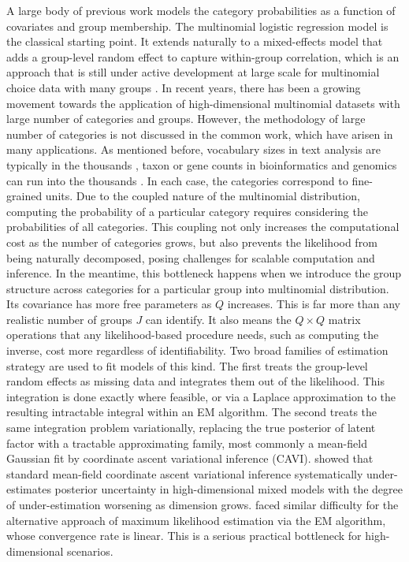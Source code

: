 A large body of previous work models the category probabilities as a function of covariates and group membership. The multinomial logistic regression model is the classical starting point. It extends naturally to a mixed-effects model that adds a group-level random effect to capture within-group correlation, which is an approach that is still under active development at large scale for multinomial choice data with many groups \citep{Zhang2026}. In recent years, there has been a growing movement towards the application of high-dimensional multinomial datasets with large number of categories and groups. 
However, the methodology of large number of categories is not discussed in the common work, which have arisen in many applications. As mentioned before, vocabulary sizes in text analysis are typically in the thousands \citep{Taddy2015}, taxon or gene counts in bioinformatics and genomics can run into the thousands \citep{Buettner2015, Tu2023}. In each case, the categories correspond to fine-grained units. Due to the coupled nature of the multinomial distribution, computing the probability of a particular category requires considering the probabilities of all categories. This coupling not only increases the computational cost as the number of categories grows, but also prevents the likelihood from being naturally decomposed, posing challenges for scalable computation and inference. In the meantime, this bottleneck happens when we introduce the group structure across categories for a particular group into multinomial distribution. Its covariance has more free parameters as $Q$ increases. This is far more than any realistic number of groups $J$ can identify. It also means the $Q \times Q$ matrix operations that any likelihood-based procedure needs, such as computing the inverse, cost more regardless of identifiability. Two broad families of estimation strategy are used to fit models of this kind. The first treats the group-level random effects as missing data and integrates them out of the likelihood. This integration is done exactly where feasible, or via a Laplace approximation to the resulting intractable integral within an EM algorithm. The second treats the same integration problem variationally, replacing the true posterior of latent factor with a tractable approximating family, most commonly a mean-field Gaussian fit by coordinate ascent variational inference (CAVI). \citet{Goplerud2024} showed that standard mean-field coordinate ascent variational inference systematically under-estimates posterior uncertainty in high-dimensional mixed models with the degree of under-estimation worsening as dimension grows. \citet{Henderson2019} faced similar difficulty for the alternative approach of maximum likelihood estimation via the EM algorithm, whose convergence rate is linear. This is a serious practical bottleneck for high-dimensional scenarios.

